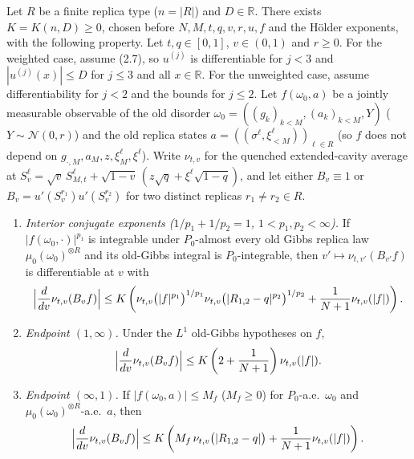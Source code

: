 \begin{theorem}\label{thm:sg-tal:perceptron-cavity-lemma-232}
  \leanok
Let $R$ be a finite replica type ($n=|R|$) and $D\in\mathbb R$. There exists $K=K(n,D)\ge0$, chosen
before $N,M,t,q,v,r,u,f$ and the H\"older exponents, with the following property. Let $t,q\in[0,1]$,
$v\in(0,1)$ and $r\ge0$. For the weighted case, assume (2.7), so $u^{(j)}$ is differentiable
for $j<3$ and $|u^{(j)}(x)|\le D$ for $j\le 3$ and all $x\in\mathbb R$. For the unweighted
case, assume differentiability for $j<2$ and the bounds for $j\le 2$. Let $f(\omega_0,a)$ be a jointly
measurable observable of the old disorder $\omega_0=((g_k)_{k<M},(a_k)_{k<M},Y)$ ($Y\sim\mathcal N(0,r)$)
and the old replica states $a=((\sigma^\ell,\xi_{<M}^\ell))_{\ell\in R}$ (so $f$ does not depend on
$g_{\cdot,M},a_M,z,\xi_M^\ell,\xi^\ell$). Write $\nu_{t,v}$ for the quenched extended-cavity average at
$S_v^\ell=\sqrt v\,S_{M,t}^\ell+\sqrt{1-v}\,(z\sqrt q+\xi^\ell\sqrt{1-q})$, and let either $B_v\equiv1$
or $B_v=u'(S_v^{r_1})u'(S_v^{r_2})$ for two distinct replicas $r_1\ne r_2\in R$.
\begin{enumerate}
\item \emph{Interior conjugate exponents ($1/p_1+1/p_2=1$, $1<p_1,p_2<\infty$).} If
$|f(\omega_0,\cdot)|^{p_1}$ is integrable under $P_0$-almost every old Gibbs replica law $\mu_0(\omega_0)^{\otimes R}$
and its old-Gibbs integral is $P_0$-integrable, then $v'\mapsto\nu_{t,v'}(B_{v'}f)$ is differentiable at $v$ with
\[
 \Bigl|\frac{d}{dv}\nu_{t,v}(B_vf)\Bigr|\le K\left(\nu_{t,v}\bigl(|f|^{p_1}\bigr)^{1/p_1}
   \nu_{t,v}\bigl(|R_{1,2}-q|^{p_2}\bigr)^{1/p_2}+\frac{1}{N+1}\nu_{t,v}(|f|)\right).
\]
\item \emph{Endpoint $(1,\infty)$.} Under the $L^1$ old-Gibbs hypotheses on $f$,
\[
 \Bigl|\frac{d}{dv}\nu_{t,v}(B_vf)\Bigr|\le K\left(2+\frac{1}{N+1}\right)\nu_{t,v}(|f|).
\]
\item \emph{Endpoint $(\infty,1)$.} If $|f(\omega_0,a)|\le M_f$ ($M_f\ge0$) for $P_0$-a.e.\ $\omega_0$ and
$\mu_0(\omega_0)^{\otimes R}$-a.e.\ $a$, then
\[
 \Bigl|\frac{d}{dv}\nu_{t,v}(B_vf)\Bigr|\le K\left(M_f\,\nu_{t,v}\bigl(|R_{1,2}-q|\bigr)+\frac{1}{N+1}\nu_{t,v}(|f|)\right).
\]
\end{enumerate}
\end{theorem}
